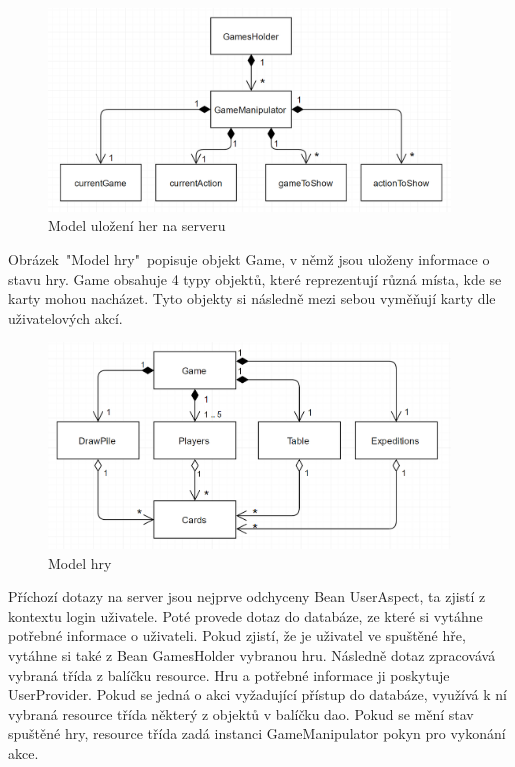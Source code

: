 \documentclass[czech,master,public,dept460,male,cpdeclaration,twoside]{diploma}
\begin{document}
\begin{figure}[H]
\centering\includegraphics[width=0.95\textwidth]{Figures/GameManipulator.png}\caption{Model uložení her na serveru}
\end{figure}

Obrázek~"Model hry"~popisuje objekt Game, v němž jsou uloženy informace o stavu hry. Game obsahuje 4 typy objektů, které reprezentují různá místa, kde se karty mohou nacházet. Tyto objekty si následně mezi sebou vyměňují karty dle uživatelových akcí.

\begin{figure}[H]
\centering\includegraphics[width=0.95\textwidth]{Figures/Game.png}\caption{Model hry}
\end{figure}

Příchozí dotazy na server jsou nejprve odchyceny Bean UserAspect, ta zjistí z kontextu login uživatele. Poté provede dotaz do databáze, ze které si vytáhne potřebné informace o uživateli. Pokud zjistí, že je uživatel ve spuštěné hře, vytáhne si také z Bean GamesHolder vybranou hru. Následně dotaz zpracovává vybraná třída z balíčku resource. Hru a potřebné informace ji poskytuje UserProvider. Pokud se jedná o akci vyžadující přístup do databáze, využívá k ní vybraná resource třída některý z objektů v balíčku dao. Pokud se mění stav spuštěné hry, resource třída zadá instanci GameManipulator pokyn pro vykonání akce.
\end{document}
